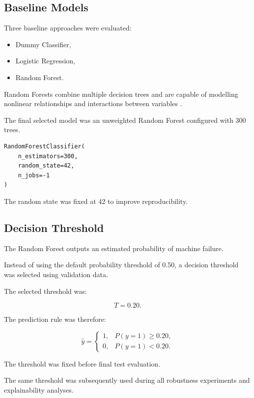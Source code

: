 \documentclass[conference]{IEEEtran}
\begin{document}
\subsection{Baseline Models}

Three baseline approaches were evaluated:

\begin{itemize}

    \item Dummy Classifier,
    \item Logistic Regression,
    \item Random Forest.

\end{itemize}

Random Forests combine multiple decision trees and are capable of modelling nonlinear relationships and interactions between variables \cite{breiman2001}.

The final selected model was an unweighted Random Forest configured with 300 trees.

\begin{verbatim}
RandomForestClassifier(
    n_estimators=300,
    random_state=42,
    n_jobs=-1
)
\end{verbatim}

The random state was fixed at 42 to improve reproducibility.

\subsection{Decision Threshold}

The Random Forest outputs an estimated probability of machine failure.

Instead of using the default probability threshold of 0.50, a decision threshold was selected using validation data.

The selected threshold was:

\[
T = 0.20.
\]

The prediction rule was therefore:

\[
\hat{y} =
\begin{cases}
1, & P(y=1) \geq 0.20,\\
0, & P(y=1) < 0.20.
\end{cases}
\]

The threshold was fixed before final test evaluation.

The same threshold was subsequently used during all robustness experiments and explainability analyses.
\end{document}
